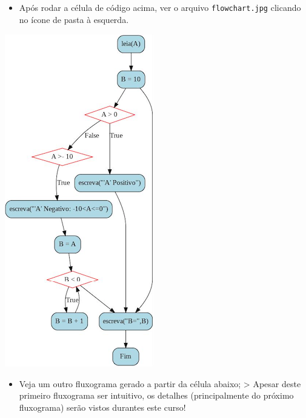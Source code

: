 \documentclass[12pt,a4paper]{article}
\providecommand{\tightlist}{%
      \setlength{\itemsep}{0pt}\setlength{\parskip}{0pt}}
\begin{document}
    \begin{itemize}
\tightlist
\item
  Após rodar a célula de código acima, ver o arquivo
  \texttt{flowchart.jpg} clicando no ícone de pasta à esquerda.
\end{itemize}

    \includegraphics{"figs/flowchart2.jpg"}

\begin{itemize}
\tightlist
\item
  Veja um outro fluxograma gerado a partir da célula abaixo;
  \textgreater{} Apesar deste primeiro fluxograma ser intuitivo, os
  detalhes (principalmente do próximo fluxograma) serão vistos durantes
  este curso!
\end{itemize}
\end{document}
